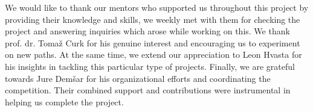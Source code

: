 \documentclass[fleqn,moreauthors,10pt]{ds_report}
\begin{document}
We would like to thank our mentors who supported us throughout this project by providing their knowledge and skills, we weekly met with them for checking the project and answering inquiries which arose while working on this. We thank prof. dr. Tomaž Curk for his genuine interest and encouraging us to experiment on new paths. At the same time, we extend our appreciation to Leon Hvasta for his insights in tackling this particular type of projects. Finally, we are grateful towards Jure Demšar for his organizational efforts and coordinating the competition. Their combined support and contributions were instrumental in helping us complete the project.



\end{document}
